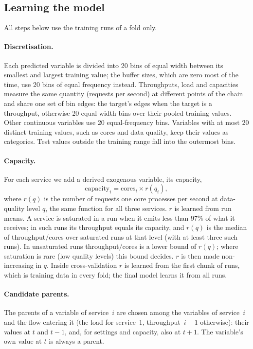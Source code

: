 \subsection{Learning the model}
\label{sec:learning}

All steps below use the training runs of a fold only.

\paragraph{Discretisation.}
Each predicted variable is divided into 20 bins of equal width between its smallest and largest training value; the buffer sizes, which are zero most of the time, use 20 bins of equal frequency instead.
Throughputs, load and capacities measure the same quantity (requests per second) at different points of the chain and share one set of bin edges: the target's edges when the target is a throughput, otherwise 20 equal-width bins over their pooled training values.
Other continuous variables use 20 equal-frequency bins.
Variables with at most 20 distinct training values, such as cores and data quality, keep their values as categories.
Test values outside the training range fall into the outermost bins.

\paragraph{Capacity.}
For each service we add a derived exogenous variable, its capacity,
\begin{equation}
  \mathrm{capacity}_i = \mathrm{cores}_i \times r(q_i),
\end{equation}
where $r(q)$ is the number of requests one core processes per second at data-quality level $q$, the same function for all three services.
$r$ is learned from run means.
A service is saturated in a run when it emits less than 97\% of what it receives; in such runs its throughput equals its capacity, and $r(q)$ is the median of throughput$/$cores over saturated runs at that level (with at least three such runs).
In unsaturated runs throughput$/$cores is a lower bound of $r(q)$; where saturation is rare (low quality levels) this bound decides.
$r$ is then made non-increasing in $q$.
Inside cross-validation $r$ is learned from the first chunk of runs, which is training data in every fold; the final model learns it from all runs.

\paragraph{Candidate parents.}
The parents of a variable of service~$i$ are chosen among the variables of service~$i$ and the flow entering it (the load for service~1, throughput~$i-1$ otherwise): their values at $t$ and $t-1$, and, for settings and capacity, also at $t+1$.
The variable's own value at $t$ is always a parent.

